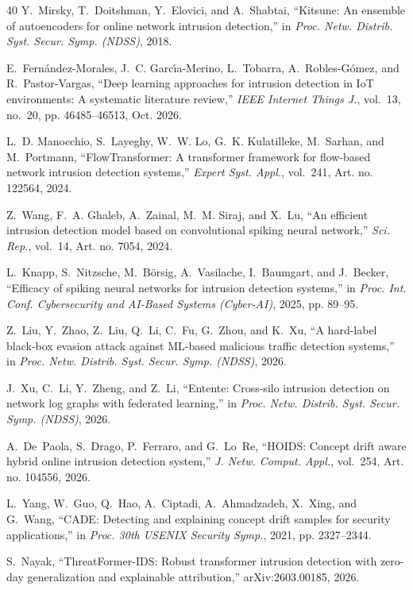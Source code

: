 \begin{thebibliography}{40}
Y.~Mirsky, T.~Doitshman, Y.~Elovici, and A.~Shabtai, ``Kitsune: An ensemble of autoencoders for online network intrusion detection,'' in \emph{Proc. Netw. Distrib. Syst. Secur. Symp. (NDSS)}, 2018.

E.~Fern\'{a}ndez-Morales, J.~C. Garc\'{\i}a-Merino, L.~Tobarra, A.~Robles-G\'{o}mez, and R.~Pastor-Vargas, ``Deep learning approaches for intrusion detection in IoT environments: A systematic literature review,'' \emph{IEEE Internet Things J.}, vol.~13, no.~20, pp. 46485--46513, Oct. 2026.

L.~D. Manocchio, S.~Layeghy, W.~W. Lo, G.~K. Kulatilleke, M.~Sarhan, and M.~Portmann, ``FlowTransformer: A transformer framework for flow-based network intrusion detection systems,'' \emph{Expert Syst. Appl.}, vol.~241, Art. no. 122564, 2024.

Z.~Wang, F.~A. Ghaleb, A.~Zainal, M.~M. Siraj, and X.~Lu, ``An efficient intrusion detection model based on convolutional spiking neural network,'' \emph{Sci. Rep.}, vol.~14, Art. no. 7054, 2024.

L.~Knapp, S.~Nitzsche, M.~B\"{o}rsig, A.~Vasilache, I.~Baumgart, and J.~Becker, ``Efficacy of spiking neural networks for intrusion detection systems,'' in \emph{Proc. Int. Conf. Cybersecurity and AI-Based Systems (Cyber-AI)}, 2025, pp. 89--95.

Z.~Liu, Y.~Zhao, Z.~Liu, Q.~Li, C.~Fu, G.~Zhou, and K.~Xu, ``A hard-label black-box evasion attack against ML-based malicious traffic detection systems,'' in \emph{Proc. Netw. Distrib. Syst. Secur. Symp. (NDSS)}, 2026.

J.~Xu, C.~Li, Y.~Zheng, and Z.~Li, ``Entente: Cross-silo intrusion detection on network log graphs with federated learning,'' in \emph{Proc. Netw. Distrib. Syst. Secur. Symp. (NDSS)}, 2026.

A.~De~Paola, S.~Drago, P.~Ferraro, and G.~Lo~Re, ``HOIDS: Concept drift aware hybrid online intrusion detection system,'' \emph{J. Netw. Comput. Appl.}, vol.~254, Art. no. 104556, 2026.

L.~Yang, W.~Guo, Q.~Hao, A.~Ciptadi, A.~Ahmadzadeh, X.~Xing, and G.~Wang, ``CADE: Detecting and explaining concept drift samples for security applications,'' in \emph{Proc. 30th USENIX Security Symp.}, 2021, pp. 2327--2344.

S.~Nayak, ``ThreatFormer-IDS: Robust transformer intrusion detection with zero-day generalization and explainable attribution,'' arXiv:2603.00185, 2026.


\end{thebibliography}
